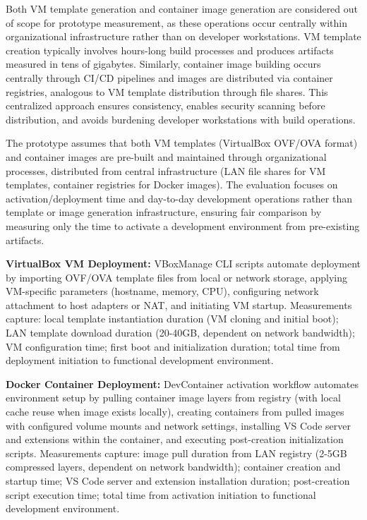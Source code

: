 Both VM template generation and container image generation are considered out of scope for prototype measurement, as these operations occur centrally within organizational infrastructure rather than on developer workstations.
VM template creation typically involves hours-long build processes and produces artifacts measured in tens of gigabytes.
Similarly, container image building occurs centrally through CI/CD pipelines and images are distributed via container registries, analogous to VM template distribution through file shares.
This centralized approach ensures consistency, enables security scanning before distribution, and avoids burdening developer workstations with build operations.

The prototype assumes that both VM templates (VirtualBox OVF/OVA format) and container images are pre-built and maintained through organizational processes, distributed from central infrastructure (LAN file shares for VM templates, container registries for Docker images).
The evaluation focuses on activation/deployment time and day-to-day development operations rather than template or image generation infrastructure, ensuring fair comparison by measuring only the time to activate a development environment from pre-existing artifacts.

\textbf{VirtualBox VM Deployment:} VBoxManage CLI scripts automate deployment by importing OVF/OVA template files from local or network storage, applying VM-specific parameters (hostname, memory, CPU), configuring network attachment to host adapters or NAT, and initiating VM startup.
Measurements capture: local template instantiation duration (VM cloning and initial boot); LAN template download duration (20-40GB, dependent on network bandwidth); VM configuration time; first boot and initialization duration; total time from deployment initiation to functional development environment.

\textbf{Docker Container Deployment:} DevContainer activation workflow automates environment setup by pulling container image layers from registry (with local cache reuse when image exists locally), creating containers from pulled images with configured volume mounts and network settings, installing VS Code server and extensions within the container, and executing post-creation initialization scripts.
Measurements capture: image pull duration from LAN registry (2-5GB compressed layers, dependent on network bandwidth); container creation and startup time; VS Code server and extension installation duration; post-creation script execution time; total time from activation initiation to functional development environment.

